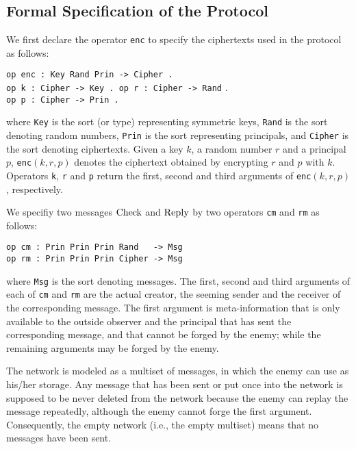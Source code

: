 \documentclass[10pt, conference, compsocconf]{IEEEtran}
\begin{document}
\subsection{Formal Specification of the Protocol}
We first declare the operator \verb!enc! to specify the ciphertexts used in the protocol as follows:

\smallskip
\begin{small}
\noindent
\verb!op enc : Key Rand Prin -> Cipher .!\\
\verb!op k : Cipher -> Key . op r : Cipher -> Rand! .\\
\verb!op p : Cipher -> Prin .!
\end{small}
\smallskip

\noindent
where \verb!Key! is the sort (or type) representing symmetric keys,
\verb!Rand! is the sort denoting random numbers, 
\verb!Prin! is the sort representing principals, and
\verb!Cipher! is the sort denoting ciphertexts.
Given a key $k$, a random number $r$ and a principal $p$, 
\verb!enc!$(k,r,p)$ denotes the ciphertext obtained by encrypting $r$ and $p$ with $k$.
Operators \verb!k!, \verb!r! and \verb!p! return the first, second and third arguments of \verb!enc!$(k, r, p)$, respectively.


We specifiy two messages $\rm Check$ and $\rm Reply$ by two operators \verb!cm! and \verb!rm! as follows:
\begin{small}
	\begin{verbatim}
op cm : Prin Prin Prin Rand   -> Msg
op rm : Prin Prin Prin Cipher -> Msg
	\end{verbatim}
\end{small}

\noindent
where \verb!Msg! is the sort denoting messages.
The first, second and third arguments of each of \verb!cm! and \verb!rm! are the actual creator, the seeming sender and the receiver of the corresponding message. The first argument is meta-information that is only available to the outside observer and the principal that has sent the corresponding message, and that cannot be forged by the enemy; while the remaining arguments may be forged by the enemy. 

The network is modeled as a multiset of messages, in which the enemy can use as his/her storage. Any message that has been sent or put once into the network is supposed to be never deleted from the network because the enemy can replay the message repeatedly, although the enemy cannot forge the first argument. Consequently, the empty network (i.e., the empty multiset) means that no messages have been sent.
\end{document}
